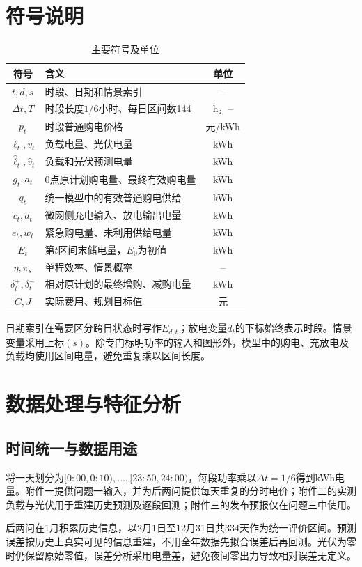 \section{符号说明}
\begin{table}[htbp]\centering\small
\caption{主要符号及单位}\label{tab:symbols}
\begin{tabular}{clc}\toprule
符号 & 含义 & 单位\\\midrule
$t,d,s$ & 时段、日期和情景索引 & --\\
$\Delta t,T$ & 时段长度$1/6$小时、每日区间数144 & h，--\\
$p_t$ & 时段普通购电价格 & 元/kWh\\
$\ell_t,v_t$ & 负载电量、光伏电量 & kWh\\
$\widehat\ell_t,\widehat v_t$ & 负载和光伏预测电量 & kWh\\
$g_t,a_t$ & 0点原计划购电量、最终有效购电量 & kWh\\
$q_t$ & 统一模型中的有效普通购电供给 & kWh\\
$c_t,d_t$ & 微网侧充电输入、放电输出电量 & kWh\\
$e_t,w_t$ & 紧急购电量、未利用供给电量 & kWh\\
$E_t$ & 第$t$区间末储电量，$E_0$为初值 & kWh\\
$\eta,\pi_s$ & 单程效率、情景概率 & --\\
$\delta_t^+,\delta_t^-$ & 相对原计划的最终增购、减购电量 & kWh\\
$C,J$ & 实际费用、规划目标值 & 元\\
\bottomrule\end{tabular}
\end{table}
日期索引在需要区分跨日状态时写作$E_{d,t}$；放电变量$d_t$的下标始终表示时段。情景变量采用上标$(s)$。除专门标明功率的输入和图形外，模型中的购电、充放电及负载均使用区间电量，避免重复乘以区间长度。

\section{数据处理与特征分析}
\subsection{时间统一与数据用途}
将一天划分为$[0{:}00,0{:}10),\ldots,[23{:}50,24{:}00)$，每段功率乘以$\Delta t=1/6$得到kWh电量。附件一提供问题一输入，并为后两问提供每天重复的分时电价；附件二的实测负载与光伏用于重建历史预测及逐段回测；附件三的发布预报仅在问题三中使用。

后两问在1月积累历史信息，以2月1日至12月31日共334天作为统一评价区间。预测误差按历史上真实可见的信息重建，不用全年数据先拟合误差后再回测。光伏为零时仍保留原始零值，误差分析采用电量差，避免夜间零出力导致相对误差无定义。

